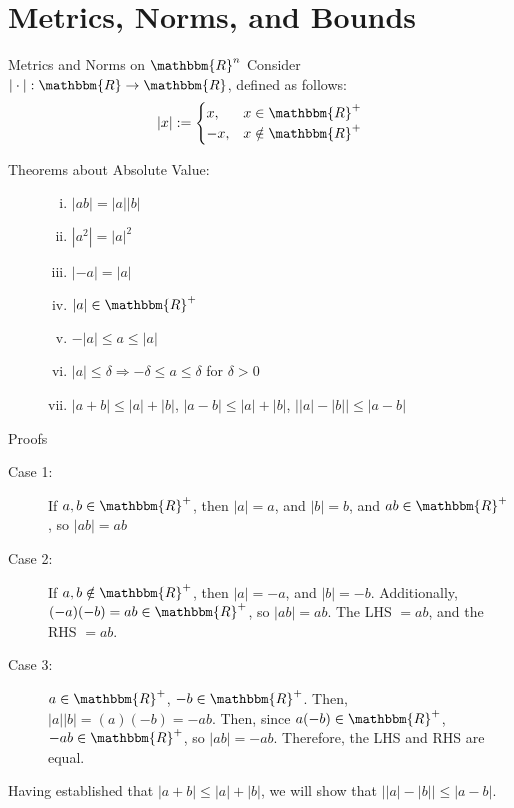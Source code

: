 \documentclass[10pt]{extarticle}
\newcommand{\R}{\mathbbm{R}}
\begin{document}
  \section*{Metrics, Norms, and Bounds}%
  \begin{problem}{Metrics and Norms on $\R^n$}
    Consider $|\cdot|: \R \rightarrow \R$, defined as follows:
    \[
      |x| := \begin{cases}
        x,&x\in\R^+\\
        -x,&x\notin\R^+
      \end{cases}
    \] 
    \begin{description}
      \item[Theorems about Absolute Value:]\hfill
        \begin{enumerate}[(i)]
          \item $|ab| = |a||b|$
          \item $|a^2| = |a|^2$
          \item $|-a| = |a|$
          \item $|a|\in\R^+$
          \item $-|a| \leq a \leq |a|$
          \item $|a| \leq \delta \Rightarrow -\delta \leq a \leq \delta$ for $\delta > 0$
          \item $|a+b| \leq |a| + |b|$, $|a-b| \leq |a| + |b|$, $\vert|a| - |b|\vert \leq |a-b|$
        \end{enumerate}
    \end{description}
    \begin{problem}{Proofs}
      \begin{description}[font=\normalfont]
        \item[Proof of (i)]\hfill
          \begin{description}
            \item[Case 1:] If $a,b\in\R^+$, then $|a| = a$, and $|b| = b$, and $ab \in \R^+$, so $|ab| = ab$
            \item[Case 2:] If $a,b\notin\R^+$, then $|a| = -a$, and $|b| = -b$. Additionally, $(-a)(-b)=ab \in\R^+$, so $|ab| = ab$. The LHS $=ab$, and the RHS $=ab$.
            \item[Case 3:] $a\in\R^+$, $-b\in\R^+$. Then, $|a||b| = (a)(-b) = -ab$. Then, since $a(-b)\in\R^+$, $-ab\in\R^+$, so $|ab| = -ab$. Therefore, the LHS and RHS are equal.
          \end{description}
        \item[Proof of (vii)] Having established that $|a+b| \leq |a| + |b|$, we will show that $\vert|a| - |b|\vert \leq |a-b|$.

\end{description}
\end{problem}
\end{problem}
\end{document}
